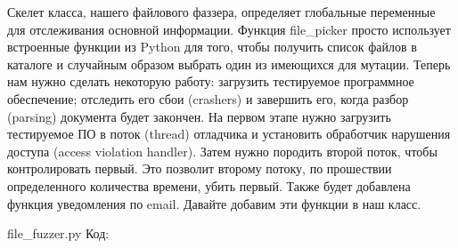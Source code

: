 \documentclass[12pt]{book}
\begin{document}


Скелет класса, нашего файлового фаззера, определяет глобальные переменные для отслеживания основной информации. Функция file\_picker просто использует встроенные функции из Python для того, чтобы получить список файлов в каталоге и случайным образом выбрать один из имеющихся для мутации. Теперь нам нужно сделать некоторую работу: загрузить тестируемое программное обеспечение; отследить его сбои (crashers) и завершить его, когда разбор (parsing) документа будет закончен. На первом этапе нужно загрузить тестируемое ПО в поток (thread) отладчика и установить обработчик нарушения доступа (access violation handler). Затем нужно породить второй поток, чтобы контролировать первый. Это позволит второму потоку, по прошествии определенного количества времени, убить первый. Также будет добавлена функция уведомления по email. Давайте добавим эти функции в наш класс.

file\_fuzzer.py
Код:








\end{document}

